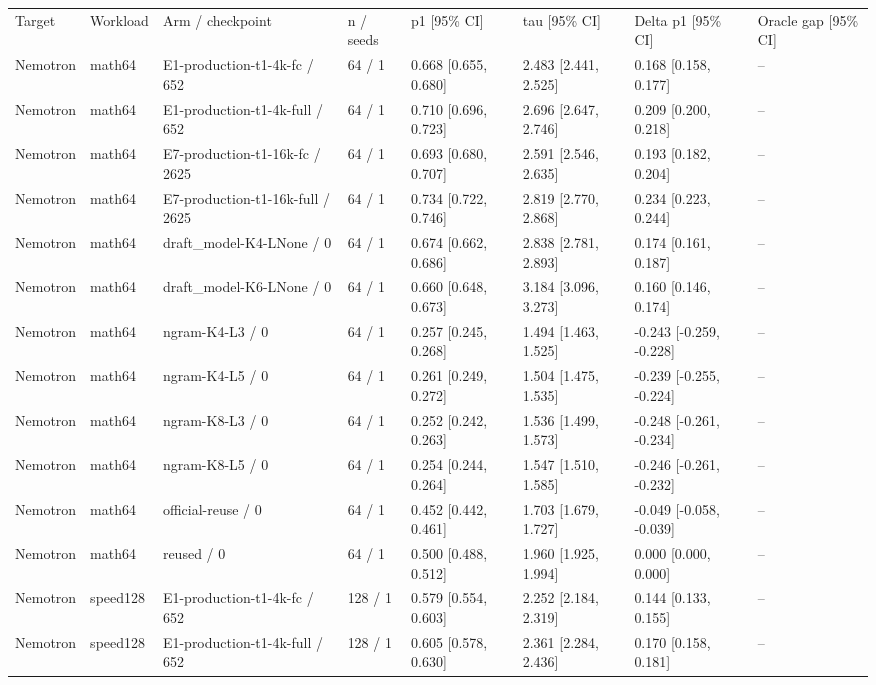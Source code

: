 \begin{tabular}{llllllll}
\hline
Target & Workload & Arm / checkpoint & n / seeds & p1 [95\% CI] & tau [95\% CI] & Delta p1 [95\% CI] & Oracle gap [95\% CI] \\
Nemotron & math64 & E1-production-t1-4k-fc / 652 & 64 / 1 & 0.668 [0.655, 0.680] & 2.483 [2.441, 2.525] & 0.168 [0.158, 0.177] & -- \\
Nemotron & math64 & E1-production-t1-4k-full / 652 & 64 / 1 & 0.710 [0.696, 0.723] & 2.696 [2.647, 2.746] & 0.209 [0.200, 0.218] & -- \\
Nemotron & math64 & E7-production-t1-16k-fc / 2625 & 64 / 1 & 0.693 [0.680, 0.707] & 2.591 [2.546, 2.635] & 0.193 [0.182, 0.204] & -- \\
Nemotron & math64 & E7-production-t1-16k-full / 2625 & 64 / 1 & 0.734 [0.722, 0.746] & 2.819 [2.770, 2.868] & 0.234 [0.223, 0.244] & -- \\
Nemotron & math64 & draft\_model-K4-LNone / 0 & 64 / 1 & 0.674 [0.662, 0.686] & 2.838 [2.781, 2.893] & 0.174 [0.161, 0.187] & -- \\
Nemotron & math64 & draft\_model-K6-LNone / 0 & 64 / 1 & 0.660 [0.648, 0.673] & 3.184 [3.096, 3.273] & 0.160 [0.146, 0.174] & -- \\
Nemotron & math64 & ngram-K4-L3 / 0 & 64 / 1 & 0.257 [0.245, 0.268] & 1.494 [1.463, 1.525] & -0.243 [-0.259, -0.228] & -- \\
Nemotron & math64 & ngram-K4-L5 / 0 & 64 / 1 & 0.261 [0.249, 0.272] & 1.504 [1.475, 1.535] & -0.239 [-0.255, -0.224] & -- \\
Nemotron & math64 & ngram-K8-L3 / 0 & 64 / 1 & 0.252 [0.242, 0.263] & 1.536 [1.499, 1.573] & -0.248 [-0.261, -0.234] & -- \\
Nemotron & math64 & ngram-K8-L5 / 0 & 64 / 1 & 0.254 [0.244, 0.264] & 1.547 [1.510, 1.585] & -0.246 [-0.261, -0.232] & -- \\
Nemotron & math64 & official-reuse / 0 & 64 / 1 & 0.452 [0.442, 0.461] & 1.703 [1.679, 1.727] & -0.049 [-0.058, -0.039] & -- \\
Nemotron & math64 & reused / 0 & 64 / 1 & 0.500 [0.488, 0.512] & 1.960 [1.925, 1.994] & 0.000 [0.000, 0.000] & -- \\
Nemotron & speed128 & E1-production-t1-4k-fc / 652 & 128 / 1 & 0.579 [0.554, 0.603] & 2.252 [2.184, 2.319] & 0.144 [0.133, 0.155] & -- \\
Nemotron & speed128 & E1-production-t1-4k-full / 652 & 128 / 1 & 0.605 [0.578, 0.630] & 2.361 [2.284, 2.436] & 0.170 [0.158, 0.181] & -- \\

\end{tabular}
